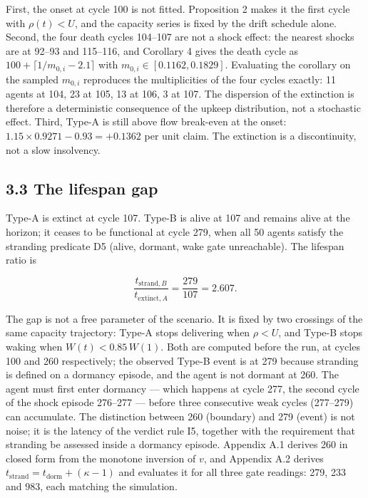 \documentclass[11pt,a4paper]{article}
\begin{document}
First, the onset at cycle 100 is not fitted. Proposition 2 makes it the first
cycle with \(\rho(t)<U\), and the capacity series is fixed by the drift schedule
alone. Second, the four death cycles 104--107 are not a shock effect: the nearest
shocks are at 92--93 and 115--116, and Corollary 4 gives the death cycle as
\(100+\lceil1/m_{0,i}-2.1\rceil\) with \(m_{0,i}\in[0.1162,0.1829]\). Evaluating the
corollary on the sampled \(m_{0,i}\) reproduces the multiplicities of the four
cycles exactly: 11 agents at 104, 23 at 105, 13 at 106, 3 at 107. The dispersion
of the extinction is therefore a deterministic consequence of the upkeep
distribution, not a stochastic effect. Third, Type-A is still above flow
break-even at the onset: \(1.15\times0.9271-0.93=+0.1362\) per unit claim. The
extinction is a discontinuity, not a slow insolvency.

\subsection{3.3 The lifespan gap}\label{the-lifespan-gap}

Type-A is extinct at cycle 107. Type-B is alive at 107 and remains alive at the
horizon; it ceases to be functional at cycle 279, when all 50 agents satisfy the
stranding predicate D5 (alive, dormant, wake gate unreachable). The lifespan
ratio is

\[
\frac{t_{\mathrm{strand},B}}{t_{\mathrm{extinct},A}}=\frac{279}{107}=2.607 .
\]

The gap is not a free parameter of the scenario. It is fixed by two crossings of
the same capacity trajectory: Type-A stops delivering when \(\rho<U\), and Type-B
stops waking when \(W(t)<0.85\,W(1)\). Both are computed before the run, at cycles
100 and 260 respectively; the observed Type-B event is at 279 because stranding
is defined on a dormancy episode, and the agent is not dormant at 260. The agent
must first enter dormancy --- which happens at cycle 277, the second cycle of the
shock episode 276--277 --- before three consecutive weak cycles (277--279) can
accumulate. The distinction between 260 (boundary) and 279 (event) is not noise;
it is the latency of the verdict rule I5, together with the requirement that
stranding be assessed inside a dormancy episode. Appendix A.1 derives 260 in closed
form from the monotone inversion of \(v\), and Appendix A.2 derives
\(t_{\mathrm{strand}}=t_{\mathrm{dorm}}+(\kappa-1)\) and evaluates it for all three
gate readings: 279, 233 and 983, each matching the simulation.
\end{document}
